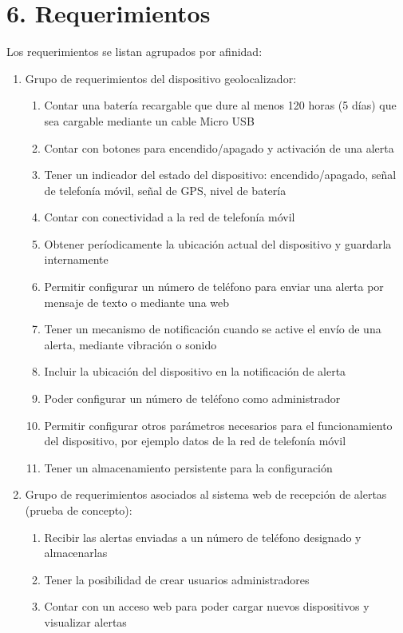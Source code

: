 \documentclass[
11pt, %
]{charter}
\begin{document}
\section{6. Requerimientos}
\label{sec:requerimientos}

Los requerimientos se listan agrupados por afinidad:

\begin{enumerate}
\item Grupo de requerimientos del dispositivo geolocalizador:
	\begin{enumerate}
	\item Contar una batería recargable que dure al menos 120 horas (5 días) que sea cargable mediante un cable Micro USB
	\item Contar con botones para encendido/apagado y activación de una alerta
	\item Tener un indicador del estado del dispositivo: encendido/apagado, señal de telefonía móvil, señal de GPS, nivel de batería
	\item Contar con conectividad a la red de telefonía móvil
	\item Obtener períodicamente la ubicación actual del dispositivo y guardarla internamente
	\item Permitir configurar un número de teléfono para enviar una alerta por mensaje de texto o mediante una web
	\item Tener un mecanismo de notificación cuando se active el envío de una alerta, mediante vibración o sonido
	\item Incluir la ubicación del dispositivo en la notificación de alerta
	\item Poder configurar un número de teléfono como administrador
	\item Permitir configurar otros parámetros necesarios para el funcionamiento del dispositivo, por ejemplo datos de la red de telefonía móvil
	\item Tener un almacenamiento persistente para la configuración
	\end{enumerate}
\item Grupo de requerimientos asociados al sistema web de recepción de alertas (prueba de concepto):
	\begin{enumerate}
	\item Recibir las alertas enviadas a un número de teléfono designado y almacenarlas
	\item Tener la posibilidad de crear usuarios administradores
	\item Contar con un acceso web para poder cargar nuevos dispositivos y visualizar alertas

\end{enumerate}
\end{enumerate}
\end{document}
